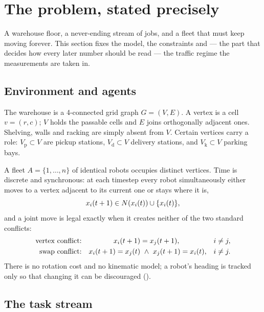 \section{The problem, stated precisely}
\label{sec:problem}

\begin{lede}
A warehouse floor, a never-ending stream of jobs, and a fleet that must keep
moving forever. This section fixes the model, the constraints and --- the part
that decides how every later number should be read --- the traffic regime the
measurements are taken in.
\end{lede}

\subsection{Environment and agents}

The warehouse is a 4-connected grid graph $G = (V, E)$. A vertex is a cell
$v = (r, c)$; $V$ holds the passable cells and $E$ joins orthogonally adjacent
ones. Shelving, walls and racking are simply absent from $V$. Certain vertices
carry a role: $V_{\mathrm{p}} \subset V$ are pickup stations,
$V_{\mathrm{d}} \subset V$ delivery stations, and $V_{\mathrm{k}} \subset V$
parking bays.

A fleet $A = \{1, \dots, n\}$ of identical robots occupies distinct vertices.
Time is discrete and synchronous: at each timestep every robot simultaneously
either moves to a vertex adjacent to its current one or stays where it is,
\begin{equation}
  x_{i}(t+1) \in N(x_{i}(t)) \cup \{x_{i}(t)\},
  \label{eq:move}
\end{equation}
and a joint move is legal exactly when it creates neither of the two standard
conflicts:
\begin{align}
  \text{vertex conflict:} && \pos{i}{t+1} &= \pos{j}{t+1}, & i &\neq j,
  \label{eq:vertex-conflict}\\
  \text{swap conflict:} && \pos{i}{t+1} = \pos{j}{t} &\ \wedge\
    \pos{j}{t+1} = \pos{i}{t}, & i &\neq j.
  \label{eq:swap-conflict}
\end{align}
There is no rotation cost and no kinematic model; a robot's heading is tracked
only so that changing it can be discouraged (\Cref{sec:score-turn}).

\subsection{The task stream}

